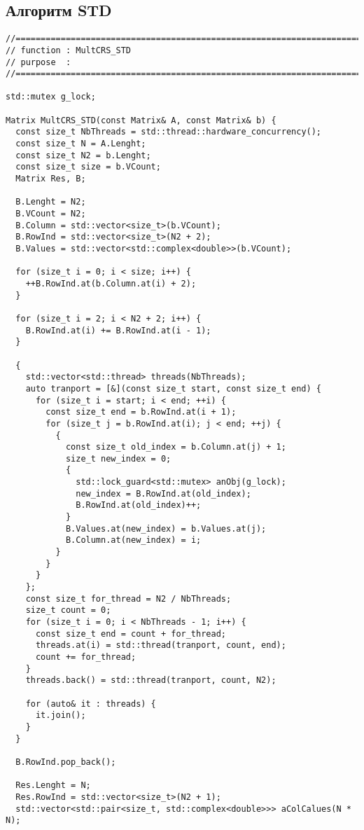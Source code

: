 \documentclass{report}
\begin{document}
\subsection*{Алгоритм STD}
\begin{lstlisting}
//=======================================================================
// function : MultCRS_STD
// purpose  :
//=======================================================================

std::mutex g_lock;

Matrix MultCRS_STD(const Matrix& A, const Matrix& b) {
  const size_t NbThreads = std::thread::hardware_concurrency();
  const size_t N = A.Lenght;
  const size_t N2 = b.Lenght;
  const size_t size = b.VCount;
  Matrix Res, B;

  B.Lenght = N2;
  B.VCount = N2;
  B.Column = std::vector<size_t>(b.VCount);
  B.RowInd = std::vector<size_t>(N2 + 2);
  B.Values = std::vector<std::complex<double>>(b.VCount);

  for (size_t i = 0; i < size; i++) {
    ++B.RowInd.at(b.Column.at(i) + 2);
  }

  for (size_t i = 2; i < N2 + 2; i++) {
    B.RowInd.at(i) += B.RowInd.at(i - 1);
  }

  {
    std::vector<std::thread> threads(NbThreads);
    auto tranport = [&](const size_t start, const size_t end) {
      for (size_t i = start; i < end; ++i) {
        const size_t end = b.RowInd.at(i + 1);
        for (size_t j = b.RowInd.at(i); j < end; ++j) {
          {
            const size_t old_index = b.Column.at(j) + 1;
            size_t new_index = 0;
            {
              std::lock_guard<std::mutex> anObj(g_lock);
              new_index = B.RowInd.at(old_index);
              B.RowInd.at(old_index)++;
            }
            B.Values.at(new_index) = b.Values.at(j);
            B.Column.at(new_index) = i;
          }
        }
      }
    };
    const size_t for_thread = N2 / NbThreads;
    size_t count = 0;
    for (size_t i = 0; i < NbThreads - 1; i++) {
      const size_t end = count + for_thread;
      threads.at(i) = std::thread(tranport, count, end);
      count += for_thread;
    }
    threads.back() = std::thread(tranport, count, N2);

    for (auto& it : threads) {
      it.join();
    }
  }

  B.RowInd.pop_back();

  Res.Lenght = N;
  Res.RowInd = std::vector<size_t>(N2 + 1);
  std::vector<std::pair<size_t, std::complex<double>>> aColCalues(N * N);


\end{lstlisting}
\end{document}

